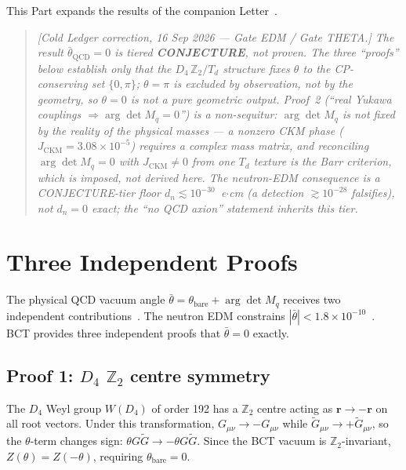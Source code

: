 \documentclass[review,number,sort&compress]{elsarticle}
\newcommand{\thetabar}{\bar{\theta}}
\newcommand{\Dfour}{D_4}
\begin{document}
This Part expands the results of the companion Letter~\cite{BCTstrongCP}.

\begin{quote}\small\itshape
[Cold Ledger correction, 16 Sep 2026 --- Gate EDM / Gate THETA.] The result
$\thetabar_{\mathrm{QCD}} = 0$ is tiered \textbf{CONJECTURE}, not proven. The three
``proofs'' below establish only that the $D_4\,\mathbb{Z}_2 / T_d$ structure fixes
$\theta$ to the CP-conserving set $\{0,\pi\}$; $\theta=\pi$ is excluded by
\emph{observation}, not by the geometry, so $\theta=0$ is not a pure geometric output.
Proof~2 (``real Yukawa couplings $\Rightarrow \arg\det M_q = 0$'') is a non-sequitur:
$\arg\det M_q$ is not fixed by the reality of the physical masses --- a nonzero
CKM phase ($J_{\mathrm{CKM}} = 3.08\times10^{-5}$) requires a complex
mass matrix, and reconciling $\arg\det M_q = 0$ with $J_{\mathrm{CKM}}\neq 0$ from one
$T_d$ texture is the Barr criterion, which is \emph{imposed}, not derived here.
The neutron-EDM consequence is a CONJECTURE-tier floor $d_n \lesssim 10^{-30}$~e$\cdot$cm
(a detection $\gtrsim 10^{-28}$ falsifies), not $d_n = 0$ exact; the ``no QCD axion''
statement inherits this tier.
\end{quote}

\section{Three Independent Proofs}
\label{sec:strongCP_proofs}

The physical QCD vacuum angle $\thetabar = \theta_{\mathrm{bare}} +
\arg\det M_q$ receives two independent contributions~\cite{tHooft1976}.
The neutron EDM constrains $|\thetabar| < 1.8 \times 10^{-10}$~\cite{Abel2020}.
BCT provides three independent proofs that $\thetabar = 0$ exactly.

\subsection{Proof 1: $\Dfour$ $\mathbb{Z}_2$ centre symmetry}

The $\Dfour$ Weyl group $W(D_4)$ of order 192 has a $\mathbb{Z}_2$ centre
acting as $\bm{r} \to -\bm{r}$ on all root vectors. Under this transformation,
$G_{\mu\nu} \to -G_{\mu\nu}$ while $\widetilde{G}_{\mu\nu} \to
+\widetilde{G}_{\mu\nu}$, so the $\theta$-term changes sign:
$\theta G\widetilde{G} \to -\theta G\widetilde{G}$. Since the BCT
vacuum is $\mathbb{Z}_2$-invariant, $Z(\theta) = Z(-\theta)$, requiring
$\theta_{\mathrm{bare}} = 0$.
\end{document}
